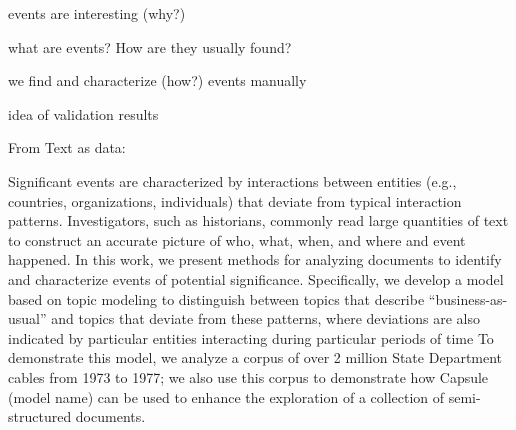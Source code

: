 \PP events are interesting (why?)

\PP what are events?  How are they usually found?

\PP we find and characterize (how?) events manually

\PP idea of validation results

From Text as data:

Significant events are characterized by interactions between entities (e.g., countries, organizations, individuals) that deviate from typical interaction patterns.  Investigators, such as historians, commonly read large quantities of text to construct an accurate picture of who, what, when, and where and event happened.  In this work, we present methods for analyzing documents to identify and characterize events of potential significance.
Specifically, we develop a model based on topic modeling to distinguish between topics that describe ``business-as-usual'' and topics that deviate from these patterns, where deviations are also indicated by particular entities interacting during particular periods of time
To demonstrate this model, we analyze a corpus of over 2 million State Department cables from 1973 to 1977; we also use this corpus to demonstrate how Capsule (model name) can be used to enhance the exploration of a collection of semi-structured documents.